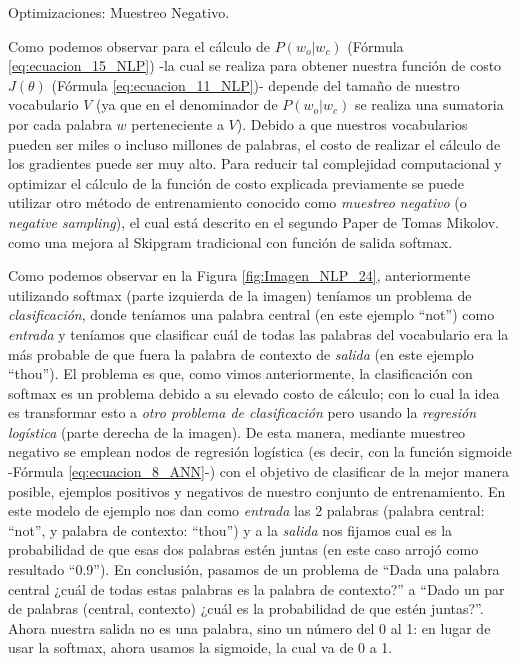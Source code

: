 \documentclass[12pt,a4paper]{article}
\makeatletter
\renewcommand\paragraph{\@startsection{paragraph}{4}{\z@}
            {-2.5ex\@plus -1ex \@minus -.25ex}
            {1.25ex \@plus .25ex}
            {\normalfont\normalsize\bfseries}}
\makeatother
\begin{document}
\begin{sloppypar}
\cleardoublepage

\paragraph{Optimizaciones: Muestreo Negativo.}\label{neg_samp}

Como podemos observar para el cálculo de $P(w_o | w_c)$ (Fórmula \ref{eq:ecuacion_15_NLP}) -la cual se realiza para obtener nuestra función de costo $J(\theta)$  (Fórmula \ref{eq:ecuacion_11_NLP})- depende del tamaño de nuestro vocabulario $V$ (ya que en el denominador de $P(w_o | w_c)$ se realiza una sumatoria por cada palabra $w$ perteneciente a $V$). Debido a que nuestros vocabularios pueden ser miles o incluso millones de palabras, el costo de realizar el cálculo de los gradientes puede ser muy alto. Para reducir tal complejidad computacional y optimizar el cálculo de la función de costo explicada previamente se puede utilizar otro método de entrenamiento conocido como \textit{muestreo negativo} (o \textit{negative sampling}), el cual está descrito en el segundo Paper de Tomas Mikolov\cite{NLP_14}.  como una mejora al Skipgram tradicional con función de salida softmax.

Como podemos observar en la Figura \ref{fig:Imagen_NLP_24}, anteriormente utilizando softmax (parte izquierda de la imagen) teníamos un problema de \textit{clasificación}, donde teníamos una palabra central (en este ejemplo “not”) como \textit{entrada} y teníamos que clasificar cuál de todas las palabras del vocabulario era la más probable de que fuera la palabra de contexto de \textit{salida} (en este ejemplo “thou”).  El problema es que, como vimos anteriormente, la clasificación con softmax es un problema debido a su elevado costo de cálculo; con lo cual la idea es transformar esto a \textit{otro problema de clasificación} pero usando la \textit{regresión logística} (parte derecha de la imagen). De esta manera, mediante muestreo negativo se emplean nodos de regresión logística (es decir, con la función sigmoide -Fórmula \ref{eq:ecuacion_8_ANN}-) con el objetivo de clasificar de la mejor manera posible, ejemplos positivos y negativos de nuestro conjunto de entrenamiento\cite{NLP_13_2}. En este modelo de ejemplo nos dan como \textit{entrada} las 2 palabras (palabra central: “not”, y palabra de contexto: “thou”) y a la \textit{salida} nos fijamos cual es la probabilidad de que esas dos palabras estén juntas (en este caso arrojó como resultado “0.9”). En conclusión, pasamos de un problema de “Dada una palabra central ¿cuál de todas estas palabras es la palabra de contexto?” a “Dado un par de palabras (central, contexto) ¿cuál es la probabilidad de que estén juntas?”. Ahora nuestra salida no es una palabra, sino un número del 0 al 1: en lugar de usar la softmax, ahora usamos la sigmoide, la cual  va de 0 a 1.


\end{sloppypar}
\end{document}
